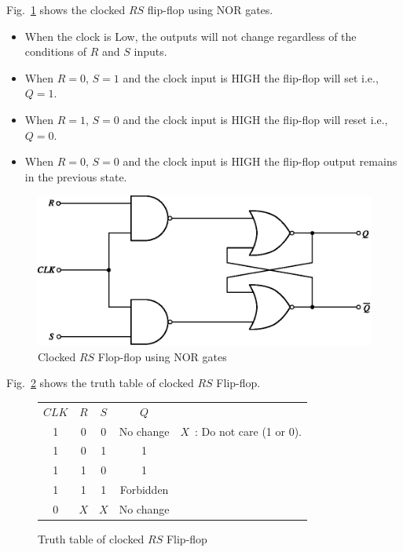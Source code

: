 Fig.~\ref{fig6.42} shows the clocked $RS$ flip-flop using NOR gates.
\begin{itemize}
\item When the clock is Low, the outputs will not change regardless of the conditions of $R$ and $S$ inputs.

\item When $R=0$, $S=1$ and the clock input is HIGH the flip-flop will set i.e., $Q=1$.

\eject

\item When $R=1$, $S=0$ and the clock input is HIGH the flip-flop will reset i.e., $Q=0$.

\item When $R=0$, $S=0$ and the clock input is HIGH the flip-flop output remains in the previous state.
\end{itemize}
\smallskip
\begin{figure}[H]
\centering
\includegraphics{chap6/fig141.eps}
\medskip
\caption{Clocked $RS$ Flop-flop using NOR gates}\label{fig6.42}
\end{figure}

\medskip

Fig.~\ref{fig6.43} shows the truth table of clocked $RS$ Flip-flop.
\begin{figure}[H]
\centering
\tabcolsep=6pt
\renewcommand{\arraystretch}{1.6}
\begin{tabular}{|c|c|c|c|c}
\cline{1-4}
\boldmath$CLK$ & \boldmath$R$ & \boldmath$S$ & \boldmath$Q$ &\\
\cline{1-4}
1 & 0 & 0 & No change & \qquad $X$~: Do not care (1 or 0).\\
1 & 0 & 1 & 1 & \\
1 & 1 & 0 & 1 & \\
1 & 1 & 1 & Forbidden & \\
0 & $X$ & $X$ & No change & \\
\cline{1-4} 
\end{tabular}
\medskip
\caption{Truth table of clocked $RS$ Flip-flop}\label{fig6.43}
\end{figure}

